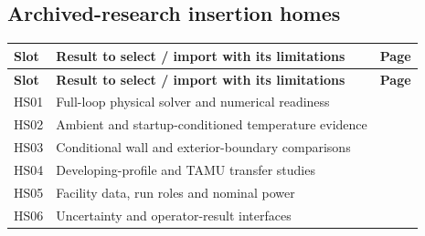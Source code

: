 \subsection{Archived-research insertion homes}
\begingroup\small
\begin{longtable}{@{}p{0.5in}p{4.8in}p{0.4in}@{}}
\textbf{Slot} & \textbf{Result to select / import with its limitations} & \textbf{Page}\\\hline
\endfirsthead
\textbf{Slot} & \textbf{Result to select / import with its limitations} & \textbf{Page}\\\hline
\endhead
HS01 & Full-loop physical solver and numerical readiness & \hyperref[research:physical-solver-and-numerics]{\pageref*{research:physical-solver-and-numerics}}\\
HS02 & Ambient and startup-conditioned temperature evidence & \hyperref[research:ambient-and-startup-comparisons]{\pageref*{research:ambient-and-startup-comparisons}}\\
HS03 & Conditional wall and exterior-boundary comparisons & \hyperref[research:conditional-wall-response]{\pageref*{research:conditional-wall-response}}\\
HS04 & Developing-profile and TAMU transfer studies & \hyperref[research:developing-profile-and-transfer-studies]{\pageref*{research:developing-profile-and-transfer-studies}}\\
HS05 & Facility data, run roles and nominal power & \hyperref[research:facility-data-and-power]{\pageref*{research:facility-data-and-power}}\\
HS06 & Uncertainty and operator-result interfaces & \hyperref[research:uncertainty-and-operator-interfaces]{\pageref*{research:uncertainty-and-operator-interfaces}}\\
\end{longtable}\endgroup
